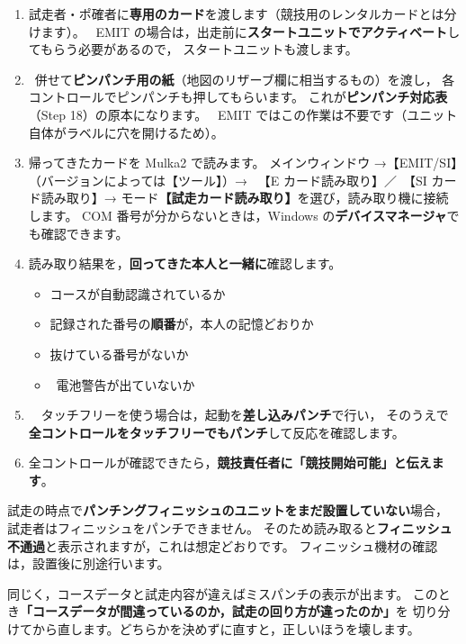 \begin{enumerate}
\item 試走者・ポ確者に\textbf{専用のカード}を渡します（競技用のレンタルカードとは分けます）。
      \tEMIT\ EMIT の場合は，出走前に\textbf{スタートユニットでアクティベート}してもらう必要があるので，
      スタートユニットも渡します。
\item \tSI\ 併せて\textbf{ピンパンチ用の紙}（地図のリザーブ欄に相当するもの）を渡し，
      各コントロールでピンパンチも押してもらいます。
      これが\textbf{ピンパンチ対応表}（Step 18）の原本になります。
      \tEMIT\ EMIT ではこの作業は不要です（ユニット自体がラベルに穴を開けるため）。
\item 帰ってきたカードを Mulka2 で読みます。
      メインウィンドウ →【EMIT/SI】（バージョンによっては【ツール】）→
      \tEMIT\ 【E カード読み取り】／\tSI\ 【SI カード読み取り】→
      モード\textbf{【試走カード読み取り】}を選び，読み取り機に接続します。\ver
      COM 番号が分からないときは，Windows の\textbf{デバイスマネージャ}でも確認できます。
\item 読み取り結果を，\textbf{回ってきた本人と一緒に}確認します。
      \begin{itemize}
      \item コースが自動認識されているか
      \item 記録された番号の\textbf{順番}が，本人の記憶どおりか
      \item 抜けている番号がないか
      \item \tEMIT\ 電池警告が出ていないか
      \end{itemize}
\item \tSI\ \tSIAC\ タッチフリーを使う場合は，起動を\textbf{差し込みパンチ}で行い，
      そのうえで\textbf{全コントロールをタッチフリーでもパンチ}して反応を確認します。
\item 全コントロールが確認できたら，\textbf{競技責任者に「競技開始可能」と伝えます}。
\end{enumerate}

\begin{Note}
試走の時点で\textbf{パンチングフィニッシュのユニットをまだ設置していない}場合，
試走者はフィニッシュをパンチできません。
そのため読み取ると\textbf{フィニッシュ不通過}と表示されますが，これは想定どおりです。
フィニッシュ機材の確認は，設置後に別途行います。

同じく，コースデータと試走内容が違えばミスパンチの表示が出ます。
このとき\textbf{「コースデータが間違っているのか，試走の回り方が違ったのか」}を
切り分けてから直します。どちらかを決めずに直すと，正しいほうを壊します。
\end{Note}

